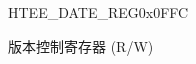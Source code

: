 \begin{register}{H}{TEE\_DATE\_REG}{0x0FFC}\label{regdesc:TEEDATEREG}
%
%
\regnewline%
\begin{regdesc}\begin{reglist}
\label{fielddesc:TEEDATEREG}\item [TEE\_DATE\_REG] 版本控制寄存器 (R/W)
\end{reglist}\end{regdesc}
\end{register}
